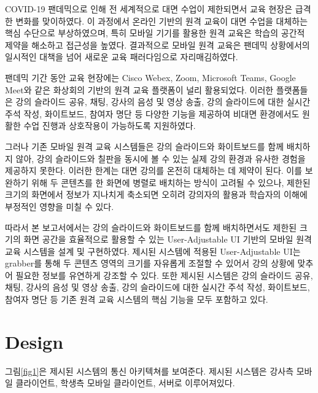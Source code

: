 \documentclass[pdflatex,sn-mathphys-num]{sn-jnl}%
\theoremstyle{thmstyleone}%
\theoremstyle{thmstyletwo}%
\theoremstyle{thmstylethree}%
\begin{document}
COVID-19 팬데믹으로 인해 전 세계적으로 대면 수업이 제한되면서 교육 현장은 급격한 변화를 맞이하였다. 이 과정에서 온라인 기반의 원격 교육이 대면 수업을 대체하는 핵심 수단으로 부상하였으며, 특히 모바일 기기를 활용한 원격 교육은 학습의 공간적 제약을 해소하고 접근성을 높였다. 결과적으로 모바일 원격 교육은 팬데믹 상황에서의 일시적인 대책을 넘어 새로운 교육 패러다임으로 자리매김하였다.

팬데믹 기간 동안 교육 현장에는 Cisco Webex\cite{Webex}, Zoom\cite{Zoom}, Microsoft Teams\cite{MicrosoftTeams}, Google Meet\cite{GoogleMeet}와 같은 화상회의 기반의 원격 교육 플랫폼이 널리 활용되었다. 이러한 플랫폼들은 강의 슬라이드 공유, 채팅, 강사의 음성 및 영상 송출, 강의 슬라이드에 대한 실시간 주석 작성, 화이트보드, 참여자 명단 등 다양한 기능을 제공하여 비대면 환경에서도 원활한 수업 진행과 상호작용이 가능하도록 지원하였다.

그러나 기존 모바일 원격 교육 시스템들은 강의 슬라이드와 화이트보드를 함께 배치하지 않아, 강의 슬라이드와 칠판을 동시에 볼 수 있는 실제 강의 환경과 유사한 경험을 제공하지 못한다. 이러한 한계는 대면 강의를 온전히 대체하는 데 제약이 된다. 이를 보완하기 위해 두 콘텐츠를 한 화면에 병렬로 배치하는 방식이 고려될 수 있으나, 제한된 크기의 화면에서 정보가 지나치게 축소되면 오히려 강의자의 활용과 학습자의 이해에 부정적인 영향을 미칠 수 있다.

따라서 본 보고서에서는 강의 슬라이드와 화이트보드를 함께 배치하면서도 제한된 크기의 화면 공간을 효율적으로 활용할 수 있는 User-Adjustable UI 기반의 모바일 원격 교육 시스템을 설계 및 구현하였다. 제시된 시스템에 적용된 User-Adjustable UI는 grabber를 통해 두 콘텐츠 영역의 크기를 자유롭게 조절할 수 있어서 강의 상황에 맞추어 필요한 정보를 유연하게 강조할 수 있다. 또한 제시된 시스템은 강의 슬라이드 공유, 채팅, 강사의 음성 및 영상 송출, 강의 슬라이드에 대한 실시간 주석 작성, 화이트보드, 참여자 명단 등 기존 원격 교육 시스템의 핵심 기능을 모두 포함하고 있다.

\section{Design}\label{sec2}

그림\ref{fig1}은 제시된 시스템의 통신 아키텍쳐를 보여준다. 제시된 시스템은 강사측 모바일 클라이언트, 학생측 모바일 클라이언트, 서버로 이루어져있다.
\end{document}

